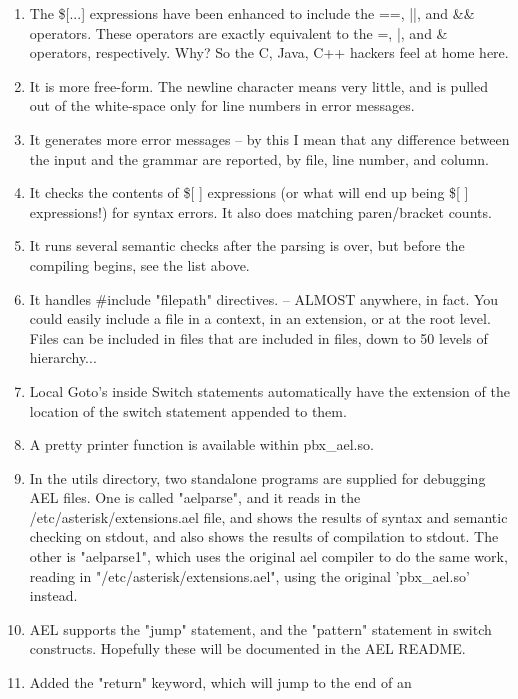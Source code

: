 {\begin{enumerate}
   \item The \$[...] expressions have been enhanced to include the ==, ||,
      and \&\& operators. These operators are exactly equivalent to the
      =, |, and \& operators, respectively. Why? So the C, Java, C++
      hackers feel at home here.
   \item It is more free-form. The newline character means very little,
      and is pulled out of the white-space only for line numbers in
      error messages.
   \item It generates more error messages -- by this I mean that any
      difference between the input and the grammar are reported, by
      file, line number, and column.
   \item It checks the contents of \$[ ] expressions (or what will end up
      being \$[ ] expressions!) for syntax errors. It also does
      matching paren/bracket counts.
   \item It runs several semantic checks after the parsing is over, but
      before the compiling begins, see the list above.
   \item It handles \#include "filepath" directives. -- ALMOST
      anywhere, in fact. You could easily include a file in a context,
      in an extension, or at the root level. Files can be included in
      files that are included in files, down to 50 levels of hierarchy...
   \item Local Goto's inside Switch statements automatically have the
      extension of the location of the switch statement appended to them.
   \item A pretty printer function is available within pbx\_ael.so.
   \item In the utils directory, two standalone programs are supplied for
      debugging AEL files. One is called "aelparse", and it reads in
      the /etc/asterisk/extensions.ael file, and shows the results of
      syntax and semantic checking on stdout, and also shows the
      results of compilation to stdout. The other is "aelparse1",
      which uses the original ael compiler to do the same work,
      reading in "/etc/asterisk/extensions.ael", using the original
      'pbx\_ael.so' instead.
  \item AEL supports the "jump" statement, and the "pattern" statement
      in switch constructs. Hopefully these will be documented in the
      AEL README.
  \item Added the "return" keyword, which will jump to the end of an

\end{enumerate}}
